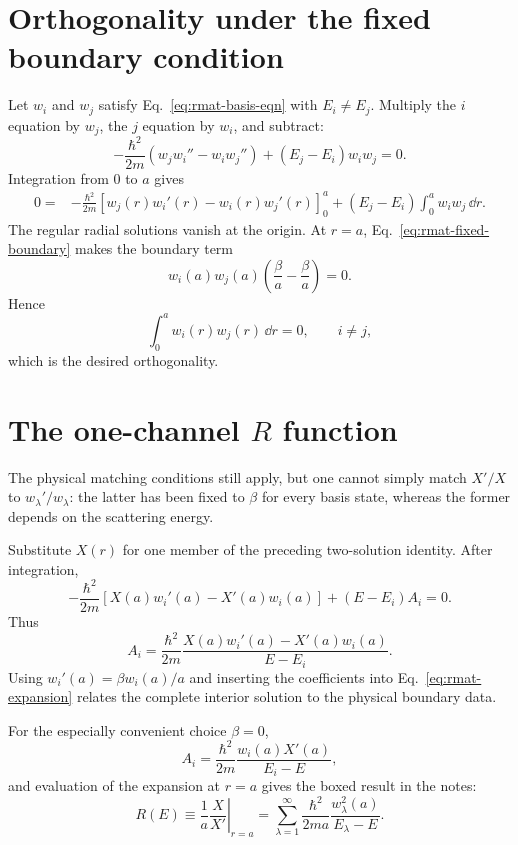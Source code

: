 \section{Orthogonality under the fixed boundary condition}
Let $w_i$ and $w_j$ satisfy Eq.~\eqref{eq:rmat-basis-eqn} with $E_i\ne E_j$.  Multiply the $i$ equation by $w_j$, the $j$ equation by $w_i$, and subtract:
\[
  -\frac{\hbar^2}{2m}
  \left(w_jw_i''-w_iw_j''\right)
  +(E_j-E_i)w_iw_j=0.
\]
Integration from $0$ to $a$ gives
\begin{align*}
  0={}&
  -\frac{\hbar^2}{2m}
  \left[w_j(r)w_i'(r)-w_i(r)w_j'(r)\right]_{0}^{a}
  +(E_j-E_i)\int_0^a w_iw_j\,\dd r.
\end{align*}
The regular radial solutions vanish at the origin.  At $r=a$, Eq.~\eqref{eq:rmat-fixed-boundary} makes the boundary term
\[
  w_i(a)w_j(a)
  \left(\frac{\beta}{a}-\frac{\beta}{a}\right)=0.
\]
Hence
\[
  \int_0^a w_i(r)w_j(r)\,\dd r=0,
  \qquad i\ne j,
\]
which is the desired orthogonality.

\section{The one-channel \texorpdfstring{$R$}{R} function}
The physical matching conditions still apply, but one cannot simply match $X'/X$ to $w_\lambda'/w_\lambda$: the latter has been fixed to $\beta$ for every basis state, whereas the former depends on the scattering energy.

Substitute $X(r)$ for one member of the preceding two-solution identity.  After integration,
\begin{equation}
  -\frac{\hbar^2}{2m}
  \left[X(a)w_i'(a)-X'(a)w_i(a)\right]
  +(E-E_i)A_i=0.
  \label{eq:rmat-Ai-boundary}
\end{equation}
Thus
\begin{equation}
  A_i=\frac{\hbar^2}{2m}
  \frac{X(a)w_i'(a)-X'(a)w_i(a)}{E-E_i}.
  \label{eq:rmat-Ai}
\end{equation}
Using $w_i'(a)=\beta w_i(a)/a$ and inserting the coefficients into Eq.~\eqref{eq:rmat-expansion} relates the complete interior solution to the physical boundary data.

For the especially convenient choice $\beta=0$,
\[
  A_i=\frac{\hbar^2}{2m}
  \frac{w_i(a)X'(a)}{E_i-E},
\]
and evaluation of the expansion at $r=a$ gives the boxed result in the notes:
\begin{equation}
  \boxed{
  R(E)
  \equiv
  \left.\frac{1}{a}\frac{X}{X'}\right|_{r=a}
  =\sum_{\lambda=1}^{\infty}
  \frac{\hbar^2}{2ma}
  \frac{w_\lambda^2(a)}{E_\lambda-E}.}
  \label{eq:rmat-one-channel}
\end{equation}

